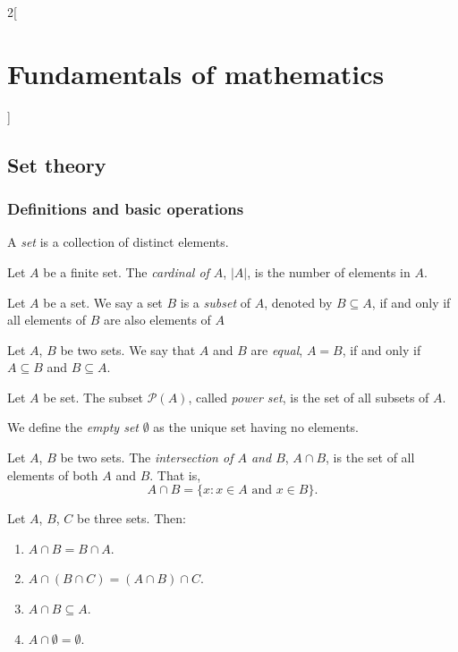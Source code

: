 \documentclass[../../../main.tex]{subfiles}
\begin{document}
\begin{multicols}{2}[\section{Fundamentals of mathematics}]
    \subsection{Set theory}
    \subsubsection*{Definitions and basic operations}
    \begin{definition}
        A \textit{set} is a collection of distinct elements.
    \end{definition}
    \begin{definition}
        Let $A$ be a finite set. The \textit{cardinal of $A$}, $|A|$, is the number of elements in $A$.
    \end{definition}
    \begin{definition}
        Let $A$ be a set. We say a set $B$ is a \textit{subset} of $A$, denoted by $B\subseteq A$, if and only if all elements of $B$ are also elements of $A$
    \end{definition}
    \begin{definition}
        Let $A$, $B$ be two sets. We say that $A$ and $B$ are \textit{equal}, $A=B$, if and only if $A\subseteq B$ and $B\subseteq A$.
    \end{definition}
    \begin{definition}
        Let $A$ be set. The subset $\mathcal{P}(A)$, called \textit{power set}, is the set of all subsets of $A$.
    \end{definition}
    \begin{definition}
        We define the \textit{empty set} $\emptyset$ as the unique set having no elements.
    \end{definition}
    \begin{definition}
        Let $A$, $B$ be two sets. The \textit{intersection of $A$ and $B$}, $A\cap B$, is the set of all elements of both $A$ and $B$. That is, $$A\cap B=\{x:x\in A\text{ and }x\in B\}.$$
    \end{definition}
    \begin{prop}
        Let $A$, $B$, $C$ be three sets. Then:
        \begin{enumerate}
            \item $A\cap B=B\cap A$.
            \item $A\cap(B\cap C)=(A\cap B)\cap C$.
            \item $A\cap B\subseteq A$.
            \item $A\cap\emptyset=\emptyset$.

\end{enumerate}
\end{prop}
\end{multicols}
\end{document}
